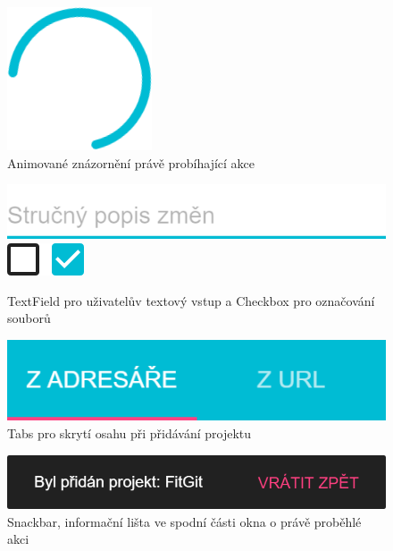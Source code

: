 \begin{figure}[ht]
	\centering
	\includegraphics[scale=0.5]{sections/ui/images/Progress.png}
	\caption[Progress]{Animované znázornění právě probíhající akce}
	\label{fig:progress}
\end{figure}

\begin{figure}[ht]
	\mbox{\includegraphics[scale=0.5]{sections/ui/images/TextField.png}}   
	\hspace{12px}
	\mbox{\includegraphics[scale=0.5]{sections/ui/images/Checkbox.png}}
	\caption[TextField a Checkbox]{TextField pro uživatelův textový vstup a Checkbox pro označování souborů}
	\label{fig:form}
\end{figure}

\begin{figure}[ht]
	\centering
	\includegraphics[scale=0.5]{sections/ui/images/Tabs.png}
	\caption[Tabs]{Tabs pro skrytí osahu při přidávání projektu}
	\label{fig:tabs}
\end{figure}

\begin{figure}[ht]
	\centering
	\includegraphics[scale=0.5]{sections/ui/images/Snackbar.png}
	\caption[Snackbar]{Snackbar, informační lišta ve spodní části okna o právě proběhlé akci}
	\label{fig:snackbar}
\end{figure}

\FloatBarrier
